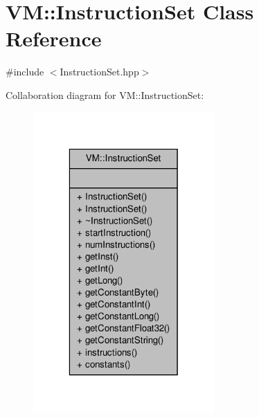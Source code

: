 \hypertarget{class_v_m_1_1_instruction_set}{\section{V\-M\-:\-:Instruction\-Set Class Reference}
\label{class_v_m_1_1_instruction_set}
}


{\ttfamily \#include $<$Instruction\-Set.\-hpp$>$}



Collaboration diagram for V\-M\-:\-:Instruction\-Set\-:
\nopagebreak
\begin{figure}[H]
\begin{center}
\leavevmode
\includegraphics[width=196pt]{class_v_m_1_1_instruction_set__coll__graph}
\end{center}
\end{figure}
